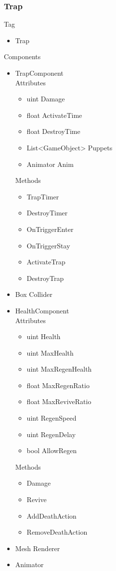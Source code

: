 \documentclass[11pt]{article}
\begin{document}
\subsubsection{Trap}
Tag
\begin{itemize}
\item Trap
\end{itemize}
Components
\begin{itemize}
\item TrapComponent
\\Attributes
\begin{itemize}
\item uint Damage
\item float ActivateTime
\item float DestroyTime
\item List<GameObject> Puppets
\item Animator Anim
\end{itemize}
Methods
\begin{itemize}
\item TrapTimer
\item DestroyTimer
\item OnTriggerEnter
\item OnTriggerStay
\item ActivateTrap
\item DestroyTrap
\end{itemize}
\item Box Collider
\item HealthComponent
\\Attributes
\begin{itemize}
\item uint Health
\item uint MaxHealth
\item uint MaxRegenHealth
\item float MaxRegenRatio
\item float MaxReviveRatio
\item uint RegenSpeed
\item uint RegenDelay
\item bool AllowRegen
\end{itemize}
Methods
\begin{itemize}
\item Damage
\item Revive
\item AddDeathAction
\item RemoveDeathAction
\end{itemize}
\item Mesh Renderer
\item Animator
\end{itemize}
\end{document}
